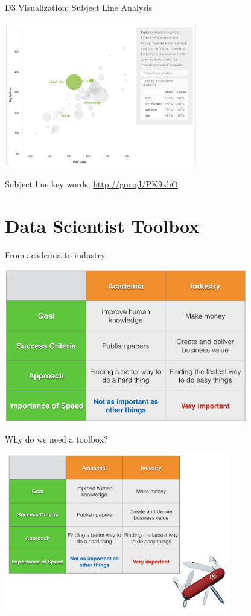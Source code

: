 \documentclass[10pt]{beamer}
\begin{document}
    \begin{frame}{D3 Visualization: Subject Line Analysis}
      \begin{center}
        \includegraphics[height=180pt]{../graphs/email_analysis_subject_line}
      \end{center}    
      {\footnotesize Subject line key words: \url{http://goo.gl/PK9xhO}}
    \end{frame}

\section{Data Scientist Toolbox}

    \begin{frame}{From academia to industry}
      \begin{center}
        \includegraphics[width=300pt]{../graphs/academia_industry}
      \end{center}
    \end{frame}

    \begin{frame}{Why do we need a toolbox?}
      \begin{center}
        \includegraphics[width=280pt]{../graphs/industry_swiss_army_knife}
      \end{center}
    \end{frame}
    
\end{document}
